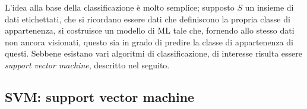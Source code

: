 \documentclass{subfiles}
\begin{document}
L'idea alla base della classificazione è molto semplice; supposto $S$ un insieme di dati etichettati,
che si ricordano essere dati che definiscono la propria classe di appartenenza,
si costruisce un modello di ML tale che, fornendo allo stesso dati non ancora visionati, questo sia in grado di predire la classe di appartenenza di questi.
Sebbene esistano vari algoritmi di classificazione, di interesse risulta essere \emph{support vector machine}, descritto nel seguito.

\subsection{SVM: support vector machine}

\end{document}
